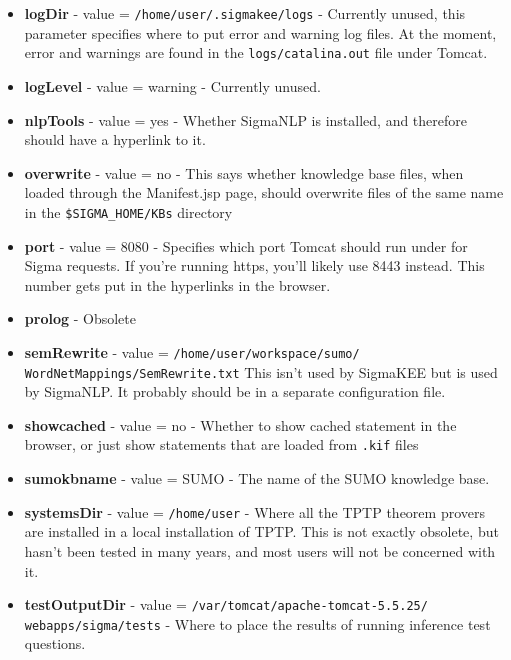 \documentclass{book}
\begin{document}
\begin{itemize}
\item \textbf{logDir}  - value = \texttt{/home/user/.sigmakee/logs} - Currently
unused, this parameter specifies where to put error and warning log files.  At
the moment, error and warnings are found in the \texttt{logs/catalina.out} file
under Tomcat.

\item \textbf{logLevel}  - value = warning - Currently unused.

\item \textbf{nlpTools}  - value = yes - Whether SigmaNLP is installed, and therefore
should have a hyperlink to it.

\item \textbf{overwrite}  - value = no - This says whether knowledge base files, when
loaded through the Manifest.jsp page, should overwrite files of the same name in the
\texttt{\$SIGMA\_HOME/KBs} directory

  \item \textbf{port} - value = 8080 - Specifies which port Tomcat should run under
for Sigma requests.  If you're running https, you'll likely use 8443 instead.  This
number gets put in the hyperlinks in the browser.

  \item \textbf{prolog} - Obsolete

  \item \begin{sloppypar}\textbf{semRewrite} - value = \texttt{/home/user/workspace/sumo/ WordNetMappings/SemRewrite.txt} 
This isn't used by SigmaKEE but is used by SigmaNLP.  It probably should be in a 
separate configuration file.\end{sloppypar}

  \item \textbf{showcached} - value = no - Whether to show cached statement in the browser, or 
just show statements that are loaded from \texttt{.kif} files

  \item \textbf{sumokbname} - value = SUMO - The name of the SUMO knowledge base.

  \item \textbf{systemsDir} - value = \texttt{/home/user}  - Where all the TPTP theorem provers
are installed in a local installation of TPTP.  This is not exactly obsolete, but hasn't
been tested in many years, and most users will not be concerned with it.

  \item \begin{sloppypar}\textbf{testOutputDir} - value = \texttt{/var/tomcat/apache-tomcat-5.5.25/ webapps/sigma/tests} 
- Where to place the results of running inference test questions.\end{sloppypar}


\end{itemize}
\end{document}
